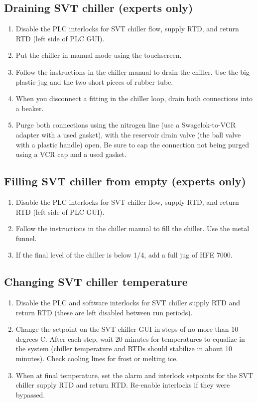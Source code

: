 \subsection{Draining SVT chiller (experts only)}
\begin{enumerate}
    \item Disable the PLC interlocks for SVT chiller flow, supply RTD, and return RTD (left side of PLC GUI).
    \item Put the chiller in manual mode using the touchscreen.
    \item Follow the instructions in the chiller manual to drain the chiller. Use the big plastic jug and the two short pieces of rubber tube.

    \item When you disconnect a fitting in the chiller loop, drain both connections into a beaker.
    \item Purge both connections using the nitrogen line (use a Swagelok-to-VCR adapter with a used gasket), with the reservoir drain valve (the ball valve with a plastic handle) open.
        Be sure to cap the connection not being purged using a VCR cap and a used gasket. 
\end{enumerate}

\subsection{Filling SVT chiller from empty (experts only)}
\begin{enumerate}
    \item Disable the PLC interlocks for SVT chiller flow, supply RTD, and return RTD (left side of PLC GUI).
    \item Follow the instructions in the chiller manual to fill the chiller. Use the metal funnel.
    \item If the final level of the chiller is below 1/4, add a full jug of HFE 7000.
\end{enumerate}

\subsection{Changing SVT chiller temperature}
\label{sec:proc_svt_chiller_tempchange}
\begin{enumerate}
    \item Disable the PLC and software interlocks for SVT chiller supply RTD and return RTD (these are left disabled between run periods).
    \item Change the setpoint on the SVT chiller GUI in steps of no more than 10 degrees C.
        After each step, wait 20 minutes for temperatures to equalize in the system (chiller temperature and RTDs should stabilize in about 10 minutes).
        Check cooling lines for frost or melting ice.
    \item When at final temperature, set the alarm and interlock setpoints for the SVT chiller supply RTD and return RTD.
        Re-enable interlocks if they were bypassed.
\end{enumerate}

